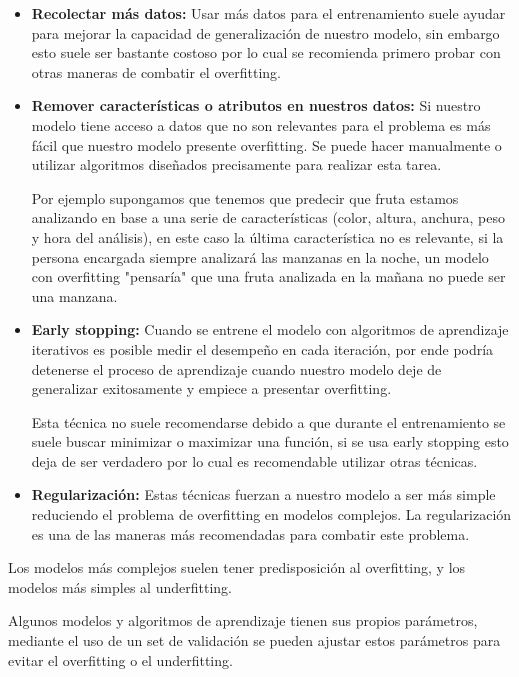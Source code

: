 \documentclass[11pt,fleqn]{book} %
\begin{document}
\begin{itemize}
\item \textbf{Recolectar más datos: } Usar más datos para el entrenamiento suele ayudar para mejorar la capacidad de generalización de nuestro modelo, sin embargo esto suele ser bastante costoso por lo cual se recomienda primero probar con otras maneras de combatir el overfitting.

\item \textbf{Remover características o atributos en nuestros datos: } Si nuestro modelo tiene acceso a datos que no son relevantes para el problema es más fácil que nuestro modelo presente overfitting. Se puede hacer manualmente o utilizar algoritmos diseñados precisamente para realizar esta tarea.

Por ejemplo supongamos que tenemos que predecir que fruta estamos analizando en base a una serie de características (color, altura, anchura, peso y hora del análisis), en este caso la última característica no es relevante, si la persona encargada siempre analizará las manzanas en la noche, un modelo con overfitting "pensaría" que una fruta analizada en la mañana no puede ser una manzana.

\item \textbf{Early stopping: } Cuando se entrene el modelo con algoritmos de aprendizaje iterativos es posible medir el desempeño en cada iteración, por ende podría detenerse el proceso de aprendizaje cuando nuestro modelo deje de generalizar exitosamente y empiece a presentar overfitting.

Esta técnica no suele recomendarse debido a que durante el entrenamiento se suele buscar minimizar o maximizar una función, si se usa early stopping esto deja de ser verdadero por lo cual es recomendable utilizar otras técnicas.

\item \textbf{Regularización: } Estas técnicas fuerzan a nuestro modelo a ser más simple reduciendo el problema de overfitting en modelos complejos. La regularización es una de las maneras más recomendadas para combatir este problema.

\end{itemize}

Los modelos más complejos suelen tener predisposición al overfitting, y los modelos más simples al underfitting. 

Algunos modelos y algoritmos de aprendizaje tienen sus propios parámetros, mediante el uso de un set de validación se pueden ajustar estos parámetros para evitar el overfitting o el underfitting.
\end{document}
